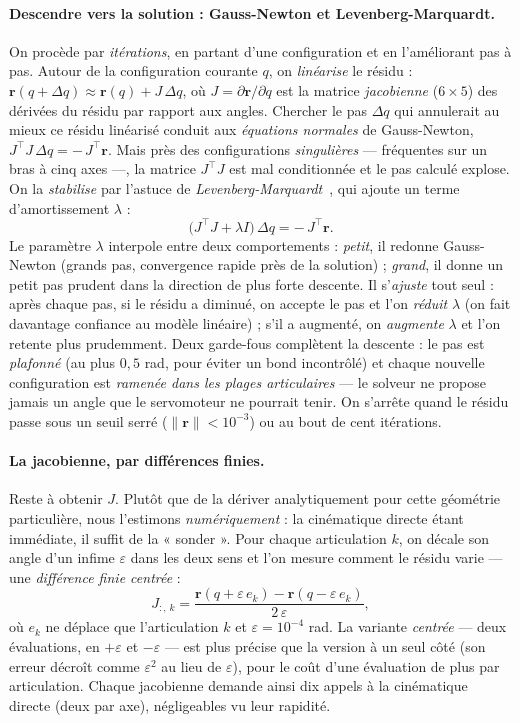 \paragraph{Descendre vers la solution : Gauss-Newton et Levenberg-Marquardt.} On procède par \emph{itérations}, en partant d'une configuration et en l'améliorant pas à pas. Autour de la configuration courante $q$, on \emph{linéarise} le résidu : $\mathbf{r}(q + \Delta q) \approx \mathbf{r}(q) + J\,\Delta q$, où $J = \partial \mathbf{r}/\partial q$ est la matrice \emph{jacobienne} ($6 \times 5$) des dérivées du résidu par rapport aux angles. Chercher le pas $\Delta q$ qui annulerait au mieux ce résidu linéarisé conduit aux \emph{équations normales} de Gauss-Newton, $J^{\top} J\,\Delta q = -\,J^{\top}\mathbf{r}$. Mais près des configurations \emph{singulières} --- fréquentes sur un bras à cinq axes ---, la matrice $J^{\top} J$ est mal conditionnée et le pas calculé explose. On la \emph{stabilise} par l'astuce de \emph{Levenberg-Marquardt}~\cite{marquardt_algorithm_1963}, qui ajoute un terme d'amortissement $\lambda$ :
\[
  \big(J^{\top} J + \lambda I\big)\,\Delta q = -\,J^{\top}\mathbf{r} .
\]
Le paramètre $\lambda$ interpole entre deux comportements : \emph{petit}, il redonne Gauss-Newton (grands pas, convergence rapide près de la solution) ; \emph{grand}, il donne un petit pas prudent dans la direction de plus forte descente. Il s'\emph{ajuste} tout seul : après chaque pas, si le résidu a diminué, on accepte le pas et l'on \emph{réduit} $\lambda$ (on fait davantage confiance au modèle linéaire) ; s'il a augmenté, on \emph{augmente} $\lambda$ et l'on retente plus prudemment. Deux garde-fous complètent la descente : le pas est \emph{plafonné} (au plus $0{,}5$ rad, pour éviter un bond incontrôlé) et chaque nouvelle configuration est \emph{ramenée dans les plages articulaires} --- le solveur ne propose jamais un angle que le servomoteur ne pourrait tenir. On s'arrête quand le résidu passe sous un seuil serré ($\lVert\mathbf{r}\rVert < 10^{-3}$) ou au bout de cent itérations.

\paragraph{La jacobienne, par différences finies.} Reste à obtenir $J$. Plutôt que de la dériver analytiquement pour cette géométrie particulière, nous l'estimons \emph{numériquement} : la cinématique directe étant immédiate, il suffit de la « sonder ». Pour chaque articulation $k$, on décale son angle d'un infime $\varepsilon$ dans les deux sens et l'on mesure comment le résidu varie --- une \emph{différence finie centrée} :
\[
  J_{:,\,k} = \frac{\mathbf{r}(q + \varepsilon\,e_k) - \mathbf{r}(q - \varepsilon\,e_k)}{2\,\varepsilon} ,
\]
où $e_k$ ne déplace que l'articulation $k$ et $\varepsilon = 10^{-4}$ rad. La variante \emph{centrée} --- deux évaluations, en $+\varepsilon$ et $-\varepsilon$ --- est plus précise que la version à un seul côté (son erreur décroît comme $\varepsilon^2$ au lieu de $\varepsilon$), pour le coût d'une évaluation de plus par articulation. Chaque jacobienne demande ainsi dix appels à la cinématique directe (deux par axe), négligeables vu leur rapidité.

